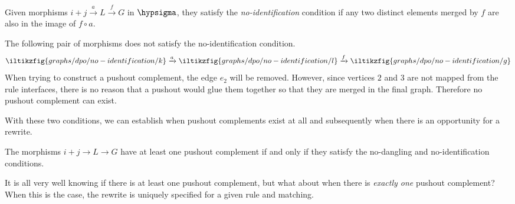 \begin{definition}
    Given morphisms \(i+j \xrightarrow{a} L \xrightarrow{f} G\) in
    \(\hypsigma\), they satisfy the \emph{no-identification} condition if any
    two distinct elements merged by \(f\) are also in the image of \(f \circ a\).
\end{definition}

\begin{example}
    The following pair of morphisms does not satisfy the no-identification
    condition.
    \[
        \iltikzfig{graphs/dpo/no-identification/k}
        \xrightarrow{a}
        \iltikzfig{graphs/dpo/no-identification/l}
        \xrightarrow{f}
        \iltikzfig{graphs/dpo/no-identification/g}
    \]
    When trying to construct a pushout complement, the edge \(e_2\) will be
    removed.
    However, since vertices \(2\) and \(3\) are not mapped from the rule
    interfaces, there is no reason that a pushout would glue them together so
    that they are merged in the final graph.
    Therefore no pushout complement can exist.
    \begin{center}
    \end{center}
\end{example}

With these two conditions, we can establish when pushout complements exist at
all and subsequently when there is an opportunity for a rewrite.

\begin{proposition}
    \label{prop:pushout-complement}
    The morphisms \(i+j \to L \to G\) have at least one pushout
    complement if and only if they satisfy the no-dangling and no-identification
    conditions.
\end{proposition}

It is all very well knowing if there is at least one pushout complement, but
what about when there is \emph{exactly one} pushout complement?
When this is the case, the rewrite is uniquely specified for a given rule and
matching.

